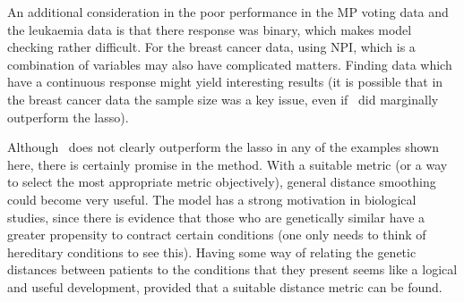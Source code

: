 An additional consideration in the poor performance in the MP voting data and the leukaemia data is that there response was binary, which makes model checking rather difficult. For the breast cancer data, using NPI, which is a combination of variables may also have complicated matters. Finding data which have a continuous response might yield interesting results (it is possible that in the breast cancer data the sample size was a key issue, even if \mdsds\ did marginally outperform the lasso).

Although \mdsds\ does not clearly  outperform the lasso in any of the examples shown here, there is certainly promise in the method. With a suitable metric (or a way to select the most appropriate metric objectively), general distance smoothing could become very useful. The model has a strong motivation in biological studies, since there is evidence that those who are genetically similar have a greater propensity to contract certain conditions (one only needs to think of hereditary conditions to see this). Having some way of relating the genetic distances between patients to the conditions that they present seems like a logical and useful development, provided that a suitable distance metric can be found.